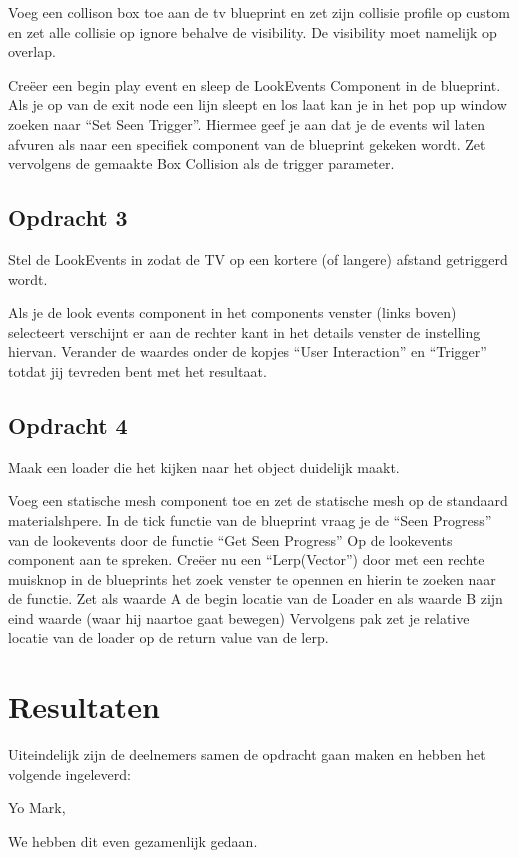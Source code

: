 Voeg een collison box toe aan de tv blueprint en zet zijn collisie profile op custom en zet alle collisie op ignore behalve de visibility. De visibility moet namelijk op overlap.

Creëer een begin play event en sleep de LookEvents Component in de blueprint. Als je op van de exit node een lijn sleept en los laat kan je in het pop up window zoeken naar “Set Seen Trigger”. Hiermee geef je aan dat je de events wil laten afvuren als naar een specifiek component van de blueprint gekeken wordt. Zet vervolgens de gemaakte Box Collision als de trigger parameter.

\subsection*{Opdracht 3}
Stel de LookEvents in zodat de TV op een kortere (of langere) afstand getriggerd wordt.

Als je de look events component in het components venster (links boven) selecteert verschijnt er aan de rechter kant in het details venster de instelling hiervan. 
Verander de waardes onder de kopjes “User Interaction” en “Trigger” totdat jij tevreden bent met het resultaat.

\subsection*{Opdracht 4}
Maak een loader die het kijken naar het object duidelijk maakt.

Voeg een statische mesh component toe en zet de statische mesh op de standaard materialshpere.
In de tick functie van de blueprint vraag je de “Seen Progress” van de lookevents door de functie “Get Seen Progress” Op de lookevents component aan te spreken.
Creëer nu een “Lerp(Vector”) door met een rechte muisknop in de blueprints het zoek venster te opennen en hierin te zoeken naar de functie.
Zet als waarde A de begin locatie van de Loader en als waarde B zijn eind waarde (waar hij naartoe gaat bewegen)
Vervolgens pak zet je relative locatie  van de loader op de return value van de lerp.

\section{Resultaten}
Uiteindelijk zijn de deelnemers samen de opdracht gaan maken en hebben het volgende ingeleverd:

Yo Mark,

We hebben dit even gezamenlijk gedaan. 


